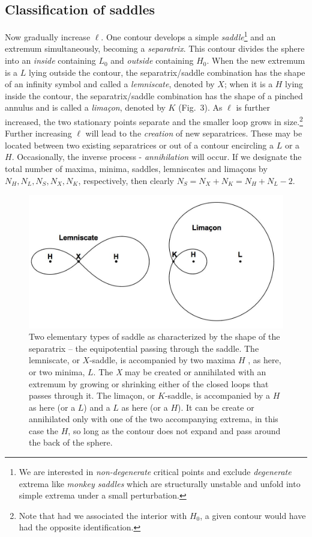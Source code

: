 \documentclass[useAMS,usenatbib,a4paper]{mn2e}
\begin{document}
\subsection{Classification of saddles}

Now gradually increase $\ell$. One contour develops a simple
\emph{saddle}\footnote{We are interested in \emph{non-degenerate}
critical points and exclude \emph{degenerate} extrema like
\emph{monkey saddles} which are structurally unstable and unfold into
simple extrema under a small perturbation.} and an extremum
simultaneously, becoming a \emph{separatrix}. This contour divides the
sphere into an \emph{inside} containing $L_0$ and \emph{outside}
containing $H_0$. When the new extremum is a $L$ lying outside the
contour, the separatrix/saddle combination has the shape of an
infinity symbol and called a \emph{lemniscate}, denoted by $X$; when
it is a $H$ lying inside the contour, the separatrix/saddle
combination has the shape of a pinched annulus and is called a
\emph{lima\c con}, denoted by $K$ (Fig.~3). As $\ell$ is further
increased, the two stationary points separate and the smaller loop
grows in size.\footnote{Note that had we associated the interior with
$H_0$, a given contour would have had the opposite identification.}
Further increasing $\ell$ will lead to the \emph{creation} of new
separatrices. These may be located between two existing separatrices
or out of a contour encircling a $L$ or a $H$.  Occasionally, the
inverse process - \emph{annihilation} will occur. If we designate the
total  number of maxima, minima, saddles, lemniscates and lima\c cons
by $N_H,N_L,N_S,N_X,N_K$, respectively, then clearly
$N_S=N_X+N_K=N_H+N_L-2$.

\begin{figure}
\centering
\includegraphics[width=0.9\linewidth]{figures/fig3.jpg}
\caption{Two elementary types of saddle as characterized by the shape of the separatrix -- the equipotential passing through the saddle. The lemniscate, or $X$-saddle, is accompanied by two maxima $H$ , as here, or two minima, $L$. The \emph X may be created or annihilated with an extremum by growing or shrinking either of the closed loops that passes through it. The lima\c con, or $K$-saddle, is accompanied by a $H$ as here (or a $L$) and a $L$ as here (or a $H$). It can be create or annihilated only with one of the two accompanying extrema, in this case the $H$, so long as the contour does not expand and pass around the back of the sphere.}
\end{figure}
\end{document}
